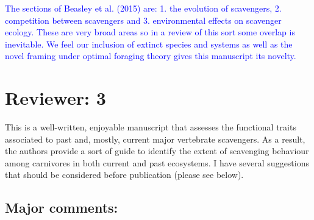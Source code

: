 \documentclass[12pt,letterpaper]{article}
\begin{document}
\textcolor{blue}{The sections of Beasley et al. (2015) are: 1. the evolution of scavengers, 2. competition between scavengers and 3. environmental effects on scavenger ecology.
These are very broad areas so in a review of this sort some overlap is inevitable.
We feel our inclusion of extinct species and systems as well as the novel framing under optimal foraging theory gives this manuscript its novelty.} 
\bigskip

\section{Reviewer: 3}
This is a well-written, enjoyable manuscript that assesses the functional traits associated to past and, mostly, current major vertebrate scavengers.
As a result, the authors provide a sort of guide to identify the extent of scavenging behaviour among carnivores in both current and past ecosystems.
I have several suggestions that should be considered before publication (please see below).

\subsection{Major comments:}
\end{document}
